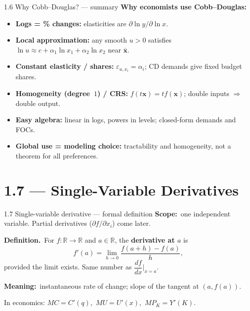 \documentclass[11pt,aspectratio=169]{beamer}
\begin{document}
\begin{frame}{1.6 Why Cobb--Douglas? --- summary}
  \small
  \textbf{Why economists use Cobb--Douglas:}
  \begin{itemize}
    \item \textbf{Logs = \% changes:}\quad
      elasticities are $\partial\ln y/\partial\ln x$.
    \item \textbf{Local approximation:}\quad
      any smooth $u>0$ satisfies
      $\ln u\approx c+\alpha_1\ln x_1+\alpha_2\ln x_2$ near $\bar{\mathbf{x}}$.
    \item \textbf{Constant elasticity / shares:}\quad
      $\varepsilon_{u,x_i}=\alpha_i$; CD demands give fixed budget shares.
    \item \textbf{Homogeneity (degree~$1$) / CRS:}\quad
      $f(t\mathbf{x})=t f(\mathbf{x})$; double inputs $\Rightarrow$ double output.
    \item \textbf{Easy algebra:}\quad
      linear in logs, powers in levels; closed-form demands and FOCs.
    \item \textbf{Global use = modeling choice:}\quad
      tractability and homogeneity, not a theorem for all preferences.
  \end{itemize}
\end{frame}

\section{1.7 --- Single-Variable Derivatives}

\begin{frame}{1.7 Single-variable derivative --- formal definition}
  \small
  \textbf{Scope:}\ one independent variable.
  Partial derivatives ($\partial f/\partial x_i$) come later.

  \medskip
  \textbf{Definition.}\ For $f\colon\mathbb{R}\to\mathbb{R}$ and $a\in\mathbb{R}$,
  the \textbf{derivative at $a$} is
  \[
    f'(a)=\lim_{h\to 0}\frac{f(a+h)-f(a)}{h},
  \]
  provided the limit exists.
  Same number as $\dfrac{df}{dx}\Big|_{x=a}$.

  \medskip
  \textbf{Meaning:}\ instantaneous rate of change; slope of the tangent at $(a,f(a))$.

  \medskip
  {\scriptsize In economics: $MC=C'(q)$,\ $MU=U'(x)$,\ $MP_K=Y'(K)$.}
\end{frame}
\end{document}

